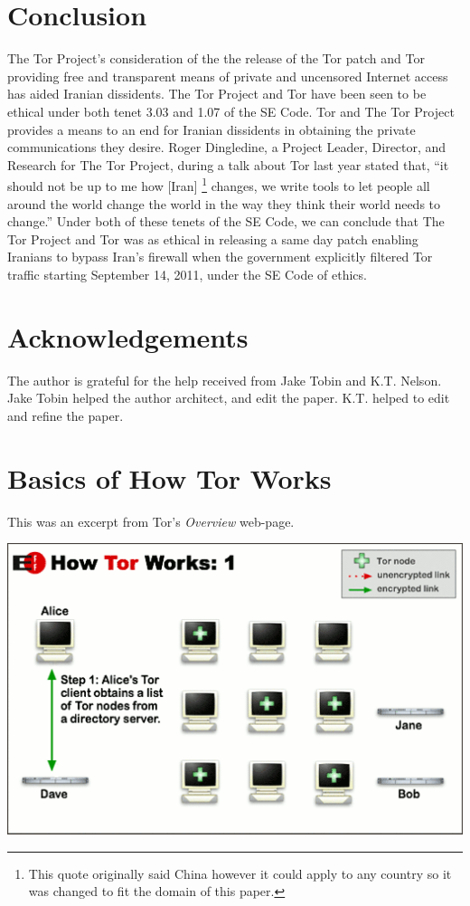 \documentclass[11pt]{article}
\begin{document}
\begin{multicols}{2}
\section{Conclusion} 

The Tor Project's consideration of the the release of the Tor patch and Tor
providing free and transparent means of private and uncensored Internet access
has aided Iranian dissidents. The Tor Project and Tor have been seen to be
ethical under both tenet 3.03 and 1.07 of the SE Code. Tor and The Tor Project
provides a means to an end for Iranian dissidents in obtaining the private
communications they desire. Roger Dingledine, a Project Leader, Director, and
Research for The Tor Project\cite{Tor:CorePeople}, during a talk about Tor last
year stated that, ``it should not be up to me how [Iran] \footnote{This quote
  originally said China however it could apply to any country so it was changed
  to fit the domain of this paper.} changes, we write tools to let people all
  around the world change the world in the way they think their world needs to
  change.'' \cite{Tor:28c3} Under both of these tenets of the SE Code, we can
  conclude that The Tor Project and Tor was as ethical in releasing a same day
  patch enabling Iranians to bypass Iran's firewall when the government
  explicitly filtered Tor traffic starting September 14, 2011, under the SE
  Code of ethics.

\section{Acknowledgements}

The author is grateful for the help received from Jake Tobin and K.T. Nelson.
Jake Tobin helped the author architect, and edit the paper. K.T. helped to edit
and refine the paper. 


\end{multicols} \newpage

\appendix


\section{Basics of How Tor Works}
\label{Tor:HowTorWorks}

This was an excerpt from Tor's \textit{Overview} web-page.\cite{Tor:Overview}

\begin{center}
\includegraphics[natwidth=510bp,natheight=326bp,width= 0.7\linewidth]{appendix/htw1.png}
\end{center}

\end{document}
